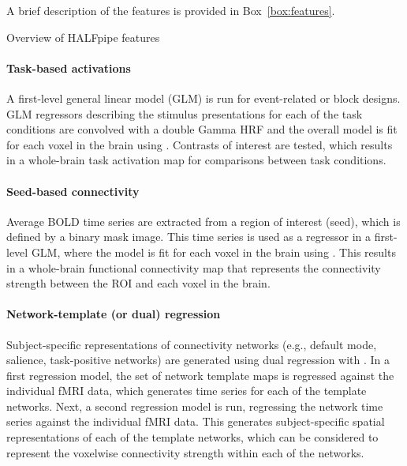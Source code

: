 A brief description of the features is provided in Box~\ref{box:features}.

\begin{featurebox}[label={box:features}]{Overview of HALFpipe features}

\paragraph{Task-based activations}

A first-level general linear model (GLM) is run for event-related or block
designs. GLM regressors describing the stimulus presentations for each of
the task conditions are convolved with a double Gamma HRF and the overall
model is fit for each voxel in the brain using 
\citep{woolrich_temporal_2001}. Contrasts of interest are tested, which
results in a whole-brain task activation map for comparisons between task
conditions.

\paragraph{Seed-based connectivity}

Average BOLD time series are extracted from a region of interest (seed),
which is defined by a binary mask image. This time series is used as a
regressor in a first-level GLM, where the model is fit for each voxel in
the brain using . This results in a whole-brain functional
connectivity map that represents the connectivity strength between the ROI
and each voxel in the brain.

\paragraph{Network-template (or dual) regression}

Subject-specific representations of connectivity networks (e.g., default
mode, salience, task-positive networks) are generated using dual regression
\citep{10.1016/s1053-8119(09)71511-3} with . In a first
regression model, the set of network template maps is regressed against the
individual fMRI data, which generates time series for each of the template
networks. Next, a second regression model is run, regressing the network
time series against the individual fMRI data. This generates
subject-specific spatial representations of each of the template networks,
which can be considered to represent the voxelwise connectivity strength
within each of the networks.


\end{featurebox}
